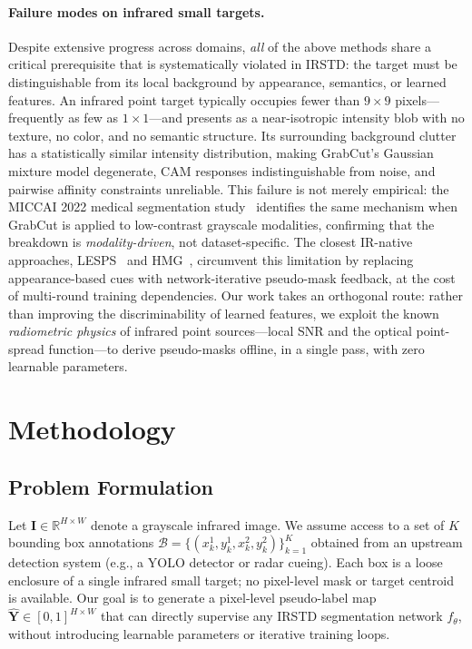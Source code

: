\paragraph{Failure modes on infrared small targets.}
Despite extensive progress across domains, \emph{all} of the above methods share a
critical prerequisite that is systematically violated in IRSTD: the target must be
distinguishable from its local background by appearance, semantics, or learned
features.
An infrared point target typically occupies fewer than $9\times9$ pixels---frequently
as few as $1\times1$---and presents as a near-isotropic intensity blob with no texture,
no color, and no semantic structure.
Its surrounding background clutter has a statistically similar intensity distribution,
making GrabCut's Gaussian mixture model degenerate, CAM responses indistinguishable
from noise, and pairwise affinity constraints unreliable.
This failure is not merely empirical: the MICCAI 2022 medical segmentation
study~\cite{boxseg_miccai2022} identifies the same mechanism when GrabCut is applied to
low-contrast grayscale modalities, confirming that the breakdown is \emph{modality-driven},
not dataset-specific.
The closest IR-native approaches, LESPS~\cite{lesps} and HMG~\cite{hmg}, circumvent
this limitation by replacing appearance-based cues with network-iterative pseudo-mask
feedback, at the cost of multi-round training dependencies.
Our work takes an orthogonal route: rather than improving the discriminability of
learned features, we exploit the known \emph{radiometric physics} of infrared point
sources---local SNR and the optical point-spread function---to derive pseudo-masks
offline, in a single pass, with zero learnable parameters.


\section{Methodology}\label{sec:method}

\subsection{Problem Formulation}
\label{sec:method_prob}

Let $\mathbf{I} \in \mathbb{R}^{H \times W}$ denote a grayscale infrared image.
We assume access to a set of $K$ bounding box annotations
$\mathcal{B} = \{(x_k^1, y_k^1, x_k^2, y_k^2)\}_{k=1}^K$ obtained from an upstream
detection system (e.g., a YOLO detector or radar cueing).
Each box is a loose enclosure of a single infrared small target; no pixel-level mask
or target centroid is available.
Our goal is to generate a pixel-level pseudo-label map
$\hat{\mathbf{Y}} \in [0,1]^{H \times W}$ that can directly supervise any IRSTD
segmentation network $f_\theta$, without introducing learnable parameters or iterative
training loops.

